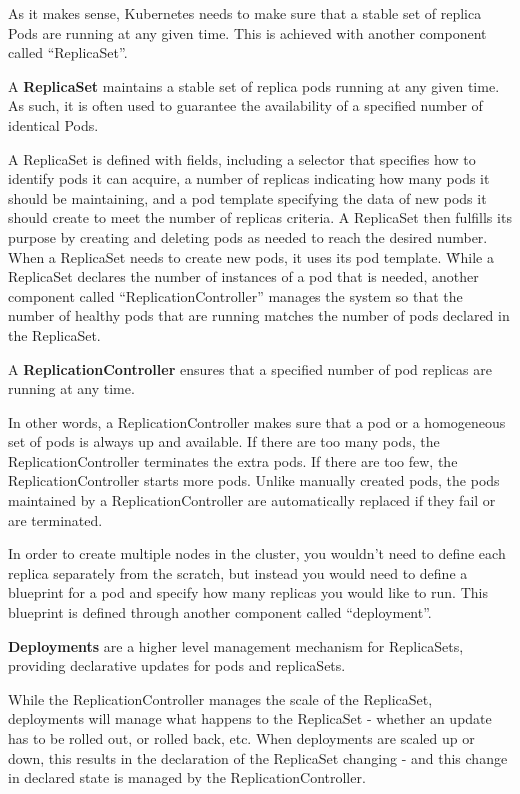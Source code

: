 
As it makes sense, Kubernetes needs to make sure that a stable set of replica Pods are running at any given time.
This is achieved with another component called ``ReplicaSet''.

\bd[ReplicaSet]
A \textbf{ReplicaSet} maintains a stable set of replica pods running at any given time. As such, it is often used to
guarantee the availability of a specified number of identical Pods.
\ed

A ReplicaSet is defined with fields, including a selector that specifies how to identify pods it can acquire, a
number of replicas indicating how many pods it should be maintaining, and a pod template specifying the data of new
pods it should create to meet the number of replicas criteria. A ReplicaSet then fulfills its purpose by creating and
deleting pods as needed to reach the desired number. When a ReplicaSet needs to create new pods, it uses its pod
template. \v

While a ReplicaSet declares the number of instances of a pod that is needed, another component called
``ReplicationController'' manages the system so that the number of healthy pods that are running matches the number
of pods declared in the ReplicaSet.

\bd[ReplicationController]
A \textbf{ReplicationController} ensures that a specified number of pod replicas are running at any time.
\ed

In other words, a ReplicationController makes sure that a pod or a homogeneous set of pods is always up and available.
If there are too many pods, the ReplicationController terminates the extra pods. If there are too few, the
ReplicationController starts more pods. Unlike manually created pods, the pods maintained by a ReplicationController
are automatically replaced if they fail or are terminated.


In order to create multiple nodes in the cluster, you wouldn't need to define each replica separately from the
scratch, but instead you would need to define a blueprint for a pod and specify how many replicas you would like to
run. This blueprint is defined through another component called ``deployment''.

\bd[Deployment]
\textbf{Deployments} are a higher level management mechanism for ReplicaSets, providing declarative updates for pods and
replicaSets.
\ed

While the ReplicationController manages the scale of the ReplicaSet, deployments will manage what happens to the
ReplicaSet - whether an update has to be rolled out, or rolled back, etc. When deployments are scaled up or down,
this results in the declaration of the ReplicaSet changing - and this change in declared state is managed by the
ReplicationController.

